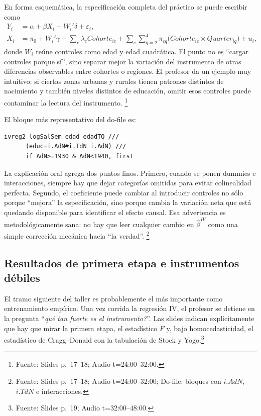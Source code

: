 \documentclass[11pt]{article}
\newcommand{\q}[1]{``#1''}
\newcommand{\source}[2]{\footnote{Fuente: Slides p.~#1; Audio t=#2.}}
\newcommand{\sourced}[3]{\footnote{Fuente: Slides p.~#1; Audio t=#2; Do-file: #3.}}
\begin{document}
En forma esquemática, la especificación completa del práctico se puede escribir como
\[
\begin{aligned}
Y_i &= \alpha + \beta X_i + W_i'\delta + \varepsilon_i,\\
X_i &= \pi_0 + W_i'\gamma + \sum_c \lambda_c Cohorte_{ic}
     + \sum_c \sum_{q=2}^{4}\pi_{cq}\big(Cohorte_{ic}\times Quarter_{iq}\big)+u_i,
\end{aligned}
\]
donde \(W_i\) reúne controles como edad y edad cuadrática. El punto no es \q{cargar controles porque sí}, sino separar mejor la variación del instrumento de otras diferencias observables entre cohortes o regiones. El profesor da un ejemplo muy intuitivo: si ciertas zonas urbanas y rurales tienen patrones distintos de nacimiento y también niveles distintos de educación, omitir esos controles puede contaminar la lectura del instrumento. \source{17--18}{24:00--32:00}

El bloque más representativo del do-file es:
\begin{lstlisting}
ivreg2 logSalSem edad edadTQ ///
      (educ=i.AdN#i.TdN i.AdN) ///
      if AdN>=1930 & AdN<1940, first
\end{lstlisting}

La explicación oral agrega dos puntos finos. Primero, cuando se ponen dummies e interacciones, siempre hay que dejar categorías omitidas para evitar colinealidad perfecta. Segundo, el coeficiente puede cambiar al introducir controles no sólo porque \q{mejora} la especificación, sino porque cambia la variación neta que está quedando disponible para identificar el efecto causal. Esa advertencia es metodológicamente sana: no hay que leer cualquier cambio en \(\hat\beta^{IV}\) como una simple corrección mecánica hacia \q{la verdad}. \sourced{17--18}{24:00--32:00}{bloques con \(i.AdN\), \(i.TdN\) e interacciones}

\subsection{Resultados de primera etapa e instrumentos débiles}

El tramo siguiente del taller es probablemente el más importante como entrenamiento empírico. Una vez corrida la regresión IV, el profesor se detiene en la pregunta \q{\emph{qué tan fuerte es el instrumento?}}. Las slides indican explícitamente que hay que mirar la primera etapa, el estadístico \(F\) y, bajo homocedasticidad, el estadístico de Cragg--Donald con la tabulación de Stock y Yogo.\source{19}{32:00--48:00}
\end{document}
